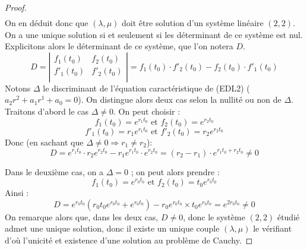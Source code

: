 \documentclass{article}
\begin{document}
\begin{proof}
$$\begin{array}{ccl}
\end{array} $$
On en déduit donc que $(\lambda, \mu)$ doit être solution d'un système linéaire $(2,2)$. On a une unique solution si et seulement si les déterminant de ce système est nul. \\
Explicitons alors le déterminant de ce système, que l'on notera $D$.
$$D = \left| 
\begin{array}{cc}
f_{1}(t_{0}) &f_{2}(t_{0}) \\
f'_{1}(t_{0}) &f'_{2}(t_{0}) \\
\end{array}
\right| = f_{1}(t_{0}) \cdot f'_{2}(t_{0}) - f_{2}(t_{0}) \cdot f'_{1}(t_{0}) $$
Notons $\Delta$ le discriminant de l'équation caractéristique de (EDL2) ($a_{2}r^{2} + a_{1}r^{1} + a_{0} = 0$). On distingue alors deux cas selon la nullité ou non de $\Delta$. Traitons d'abord le cas $\Delta \neq 0$. On peut choisir : 
$$ f_{1}(t_{0}) = e^{r_{1}t_{0}} \text{ et } f_{2}(t_{0}) = e^{r_{2}t_{0}}$$
$$ f'_{1}(t_{0}) = r_{1}e^{r_{1}t_{0}} \text{ et } f'_{2}(t_{0}) = r_{2}e^{r_{2}t_{0}}$$
Donc (en sachant que $\Delta \neq 0 \Rightarrow r_{1} \neq r_{2}$):
$$ D = e^{r_{1}t_{0}} \cdot r_{2}e^{r_{2}t_{0}} - r_{1}e^{r_{1}t_{0}} \cdot e^{r_{2}t_{0}} = (r_{2} - r_{1}) \cdot e^{r_{1}t_{0} + r_{2}t_{0}} \neq 0$$

Dans le deuxième cas, on a $\Delta = 0$ ; on peut alors prendre :
$$ f_{1}(t_{0}) = e^{r_{0}t_{0}} \text{ et } f_{2}(t_{0}) = t_{0}e^{r_{0}t_{0}}$$
Ainsi : 
$$ D = e^{r_{0}t_{0}} \left(r_{0}t_{0}e^{r_{0}t_{0}} + e^{r_{0}t_{0}} \right) - r_{0}e^{r_{0}t_{0}} \times t_{0}e^{r_{0}t_{0}} = e^{2r_{0}t_{0}} \neq 0$$
On remarque alors que, dans les deux cas, $D \neq 0$, donc le système $(2, 2)$ étudié admet une unique solution, donc il existe un unique couple $(\lambda, \mu)$ le vérifiant d'où l'unicité et existence d'une solution au problème de Cauchy. 
\newline\newline


\end{proof}
\end{document}
